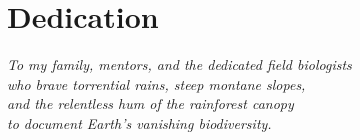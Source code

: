 
\chapter*{Dedication}

\vspace*{2.0in}

\begin{center}
\itshape
To my family, mentors, and the dedicated field biologists\\
who brave torrential rains, steep montane slopes,\\
and the relentless hum of the rainforest canopy\\
to document Earth's vanishing biodiversity.
\end{center}
